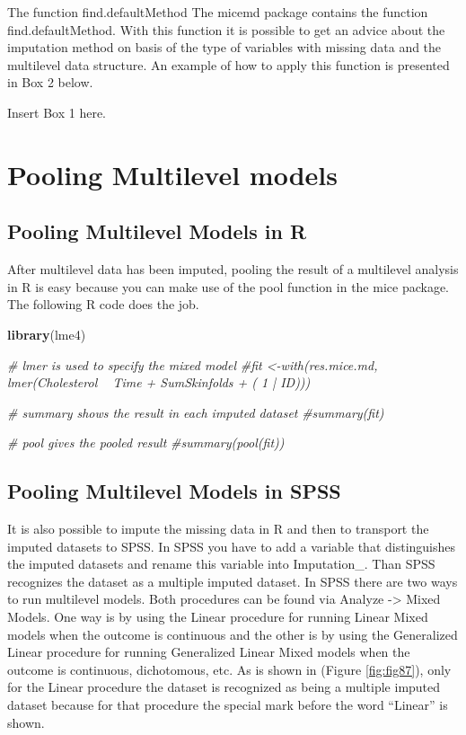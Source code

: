 \documentclass[]{book}
\newenvironment{Shaded}{\begin{snugshade}}{\end{snugshade}}
\newcommand{\KeywordTok}[1]{\textcolor[rgb]{0.13,0.29,0.53}{\textbf{#1}}}
\newcommand{\CommentTok}[1]{\textcolor[rgb]{0.56,0.35,0.01}{\textit{#1}}}
\newcommand{\NormalTok}[1]{#1}
\begin{document}
The function find.defaultMethod The micemd package contains the function
find.defaultMethod. With this function it is possible to get an advice
about the imputation method on basis of the type of variables with
missing data and the multilevel data structure. An example of how to
apply this function is presented in Box 2 below.

Insert Box 1 here.

\section{Pooling Multilevel models}\label{pooling-multilevel-models}

\subsection{Pooling Multilevel Models in
R}\label{pooling-multilevel-models-in-r}

After multilevel data has been imputed, pooling the result of a
multilevel analysis in R is easy because you can make use of the pool
function in the mice package. The following R code does the job.

\begin{Shaded}
\begin{Highlighting}[]
\KeywordTok{library}\NormalTok{(lme4)}

\CommentTok{# lmer is used to specify the mixed model}
\CommentTok{#fit <-with(res.mice.md, lmer(Cholesterol ~ Time + SumSkinfolds + ( 1 | ID)))}

\CommentTok{# summary shows the result in each imputed dataset}
\CommentTok{#summary(fit)}

\CommentTok{# pool gives the pooled result}
\CommentTok{#summary(pool(fit))}
\end{Highlighting}
\end{Shaded}

\subsection{Pooling Multilevel Models in
SPSS}\label{pooling-multilevel-models-in-spss}

It is also possible to impute the missing data in R and then to
transport the imputed datasets to SPSS. In SPSS you have to add a
variable that distinguishes the imputed datasets and rename this
variable into Imputation\_. Than SPSS recognizes the dataset as a
multiple imputed dataset. In SPSS there are two ways to run multilevel
models. Both procedures can be found via Analyze -\textgreater{} Mixed
Models. One way is by using the Linear procedure for running Linear
Mixed models when the outcome is continuous and the other is by using
the Generalized Linear procedure for running Generalized Linear Mixed
models when the outcome is continuous, dichotomous, etc. As is shown in
(Figure \ref{fig:fig87}), only for the Linear procedure the dataset is
recognized as being a multiple imputed dataset because for that
procedure the special mark before the word ``Linear'' is shown.
\end{document}
